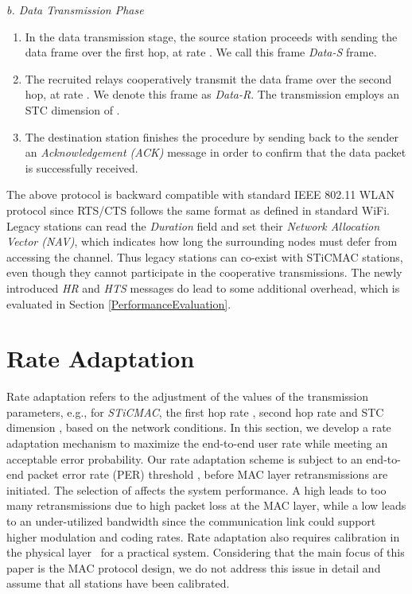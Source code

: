 \documentclass[peerreview,draftcls,onecolumn,12pt,a4paper]{IEEEtran}
\begin{document}
{\em b. Data Transmission Phase}
\begin{enumerate}

 \item In the data transmission stage, the source
station proceeds with sending the data frame over the first hop,
at rate . We call this frame \emph{Data-S} frame.

\item The recruited relays cooperatively transmit the data frame
over the second hop, at rate . We denote this frame as
\emph{Data-R}. The transmission employs an STC dimension of .

\item The destination station finishes the procedure by sending
back to the sender an \emph{Acknowledgement (ACK)} message in
order to confirm that the data packet is successfully received.
\end{enumerate}

The above protocol is backward compatible with standard IEEE 802.11 WLAN protocol since RTS/CTS follows the same format as defined in standard WiFi. Legacy stations can read the \emph{Duration} field and set their \emph{Network Allocation Vector (NAV)}, which indicates how long the surrounding nodes must defer from accessing the channel. Thus legacy stations can co-exist with STiCMAC stations, even though they cannot participate in the cooperative transmissions. The newly introduced \emph{HR} and \emph{HTS} messages do lead to some additional overhead, which is evaluated in Section \ref{PerformanceEvaluation}.


\vspace{-0.2in}
\section{Rate Adaptation} \label{sec:rateadapt}

Rate adaptation refers to the adjustment of the values of the
transmission parameters,  e.g., for \emph{STiCMAC}, the first hop
rate , second hop rate  and STC dimension , based on
the network conditions. In this section, we develop a rate
adaptation mechanism to maximize the end-to-end user rate while
meeting an acceptable error probability. Our rate adaptation
scheme is subject to an end-to-end packet error rate (PER)
threshold , before MAC layer retransmissions are
initiated. The selection of  affects the system
performance. A high  leads to too many retransmissions due
to high packet loss at the MAC layer, while a low  leads
to an under-utilized bandwidth since the communication link could
support higher modulation and coding rates. Rate adaptation also requires calibration in the physical layer~\cite{hardwareCalibrate} for a practical system. Considering that the main focus of this paper is the MAC protocol design, we do not address this issue in detail and assume that all stations have been calibrated.
\end{document}
